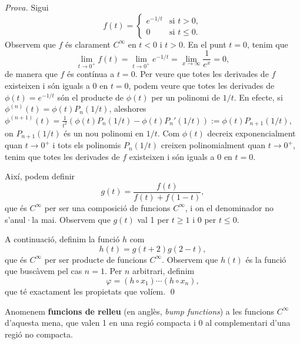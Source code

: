 {\color{black} 
    \textit{Prova.} 
    Sigui
    \begin{equation*}
        f(t) = \begin{cases}
            e^{-1/t} & \text{si } t > 0, \\
            0 & \text{si } t\le 0.
        \end{cases}
    \end{equation*}
    Observem que $f$ és clarament $C^\infty$ en $t<0$ i $t>0$. En el punt $t=0$, tenim que
    \begin{equation*}
        \lim_{t\to0^+} f(t) = \lim_{t\to0^+} e^{-1/t} = \lim_{x\to\infty} \frac{1}{e^x} = 0,
    \end{equation*}
    de manera que $f$ és contínua a $t=0$. Per veure que totes les derivades de $f$ existeixen i són iguals a $0$ en $t=0$, podem veure que totes les derivades de $\phi(t) = e^{-1/t}$ són el producte de $\phi(t)$ per un polinomi de $1/t$. En efecte, si $\phi^{(n)}(t) = \phi(t)P_n(1/t)$, aleshores $\phi^{(n+1)}(t) = \frac{1}{t^2}(\phi(t)P_n(1/t) - \phi(t)P_n'(1/t)) := \phi(t)P_{n+1}(1/t)$, on $P_{n+1}(1/t)$ és un nou polinomi en $1/t$. Com $\phi(t)$ decreix exponencialment quan $t\to0^+$ i tots els polinomis $P_n(1/t)$ creixen polinomialment quan $t\to0^+$, tenim que totes les derivades de $f$ existeixen i són iguals a $0$ en $t=0$.

    Així, podem definir
    \begin{equation*}
        g(t) = \frac{f(t)}{f(t) + f(1-t)},
    \end{equation*}
    que és $C^\infty$ per ser una composició de funcions $C^\infty$, i on el denominador no s'anul·la mai. Observem que $g(t)$ val 1 per $t\ge1$ i 0 per $t\le0$.

    A continuació, definim la funció $h$ com
    \begin{equation*}
        h(t) = g(t+2)g(2-t),
    \end{equation*}
    que és $C^\infty$ per ser producte de funcions $C^\infty$. Observem que $h(t)$ és la funció que buscàvem pel cas $n=1$. Per $n$ arbitrari, definim 
    \begin{equation}\label{eq:phi}
        \varphi = (h\circ x_1)\cdots(h\circ x_n),
    \end{equation}
    que té exactament les propietats que volíem.
    \qed
}

\begin{nota}
    Anomenem \textbf{funcions de relleu} (en anglès, \textit{bump functions}) a les funcions $C^\infty$ d'aquesta mena, que valen 1 en una regió compacta i 0 al complementari d'una regió no compacta.
\end{nota}

